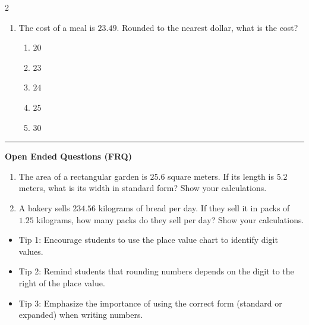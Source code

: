 \documentclass[10pt]{article}
\begin{document}
\begin{multicols}{2}
\begin{enumerate}[label=\textbf{Q\arabic*.}, leftmargin=*, itemsep=6pt, parsep=0pt]
  \item \small The cost of a meal is $23.49$. Rounded to the nearest dollar, what is the cost?
  \begin{enumerate}[label=(\Alph*), leftmargin=0.6cm, nosep, itemsep=2pt]
    \item $20$
    \item $23$
    \item $24$
    \item $25$
    \item $30$
  \end{enumerate}

\end{enumerate}
\end{multicols}

\vspace{-0.2cm}
\hrule
\vspace{0.2cm}
\textbf{\small Open Ended Questions (FRQ)}
\begin{enumerate}[label=\textbf{Q\arabic*.}, start=9, itemsep=5pt, topsep=0pt]

  \item \small The area of a rectangular garden is $25.6$ square meters. If its length is $5.2$ meters, what is its width in standard form? Show your calculations. \vspace{2cm}

  \item \small A bakery sells $234.56$ kilograms of bread per day. If they sell it in packs of $1.25$ kilograms, how many packs do they sell per day? Show your calculations. \vspace{2cm}

\end{enumerate}

\vfill

\begin{tcolorbox}[colback=blue!5, colframe=mainblue!50, title=\small \textbf{Chef's Tips}, fonttitle=\bfseries, bottom=1mm]
\begin{itemize}[noitemsep, topsep=2pt, leftmargin=0.5cm]
  \item \scriptsize Tip 1: Encourage students to use the place value chart to identify digit values.\item \scriptsize Tip 2: Remind students that rounding numbers depends on the digit to the right of the place value.\item \scriptsize Tip 3: Emphasize the importance of using the correct form (standard or expanded) when writing numbers.
\end{itemize}
\end{tcolorbox}
\end{document}
